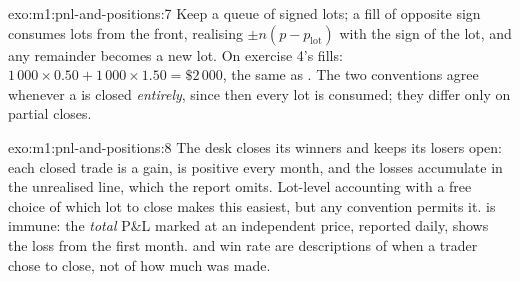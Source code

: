 \begin{solution}{exo:m1:pnl-and-positions:7}
Keep a queue of signed lots; a fill of opposite sign consumes lots from the
front, realising $\pm n(p - p_{\text{lot}})$ with the sign of the lot, and
any remainder becomes a new lot. On exercise 4's fills: $1\,000\times0.50 +
1\,000\times1.50 = \$2\,000$, the same as . The two conventions
agree whenever a  is closed \emph{entirely}, since then every lot is
consumed; they differ only on partial closes.
\end{solution}

\begin{solution}{exo:m1:pnl-and-positions:8}
The desk closes its winners and keeps its losers open: each closed trade is
a gain,  is positive every month, and the losses accumulate in
the unrealised line, which the report omits. Lot-level accounting with a free
choice of which lot to close makes this easiest, but any convention permits
it.  is immune: the \emph{total}
P\&L marked at an independent price, reported daily, shows the loss from the
first month.  and win rate are descriptions of when a trader
chose to close, not of how much was made.
\end{solution}

